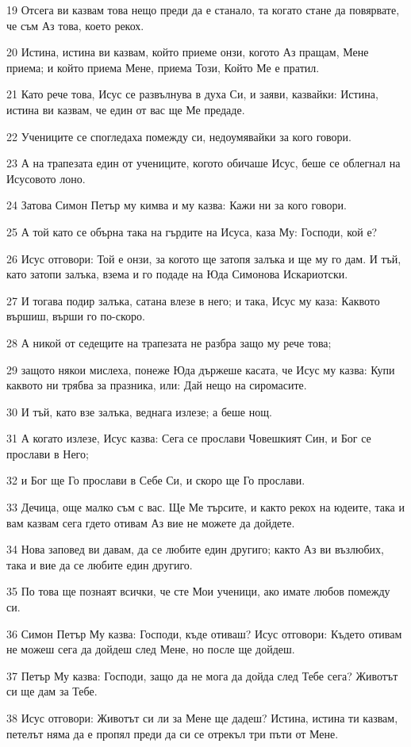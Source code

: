 \par 19 Отсега ви казвам това нещо преди да е станало, та когато стане да повярвате, че съм Аз това, което рекох.
\par 20 Истина, истина ви казвам, който приеме онзи, когото Аз пращам, Мене приема; и който приема Мене, приема Този, Който Ме е пратил.
\par 21 Като рече това, Исус се развълнува в духа Си, и заяви, казвайки: Истина, истина ви казвам, че един от вас ще Ме предаде.
\par 22 Учениците се спогледаха помежду си, недоумявайки за кого говори.
\par 23 А на трапезата един от учениците, когото обичаше Исус, беше се облегнал на Исусовото лоно.
\par 24 Затова Симон Петър му кимва и му казва: Кажи ни за кого говори.
\par 25 А той като се обърна така на гърдите на Исуса, каза Му: Господи, кой е?
\par 26 Исус отговори: Той е онзи, за когото ще затопя залъка и ще му го дам. И тъй, като затопи залъка, взема и го подаде на Юда Симонова Искариотски.
\par 27 И тогава подир залъка, сатана влезе в него; и така, Исус му каза: Каквото вършиш, върши го по-скоро.
\par 28 А никой от седещите на трапезата не разбра защо му рече това;
\par 29 защото някои мислеха, понеже Юда държеше касата, че Исус му казва: Купи каквото ни трябва за празника, или: Дай нещо на сиромасите.
\par 30 И тъй, като взе залъка, веднага излезе; а беше нощ.
\par 31 А когато излезе, Исус казва: Сега се прослави Човешкият Син, и Бог се прослави в Него;
\par 32 и Бог ще Го прослави в Себе Си, и скоро ще Го прослави.
\par 33 Дечица, още малко съм с вас. Ще Ме търсите, и както рекох на юдеите, така и вам казвам сега гдето отивам Аз вие не можете да дойдете.
\par 34 Нова заповед ви давам, да се любите един другиго; както Аз ви възлюбих, така и вие да се любите един другиго.
\par 35 По това ще познаят всички, че сте Мои ученици, ако имате любов помежду си.
\par 36 Симон Петър Му казва: Господи, къде отиваш? Исус отговори: Където отивам не можеш сега да дойдеш след Мене, но после ще дойдеш.
\par 37 Петър Му казва: Господи, защо да не мога да дойда след Тебе сега? Животът си ще дам за Тебе.
\par 38 Исус отговори: Животът си ли за Мене ще дадеш? Истина, истина ти казвам, петелът няма да е пропял преди да си се отрекъл три пъти от Мене.

